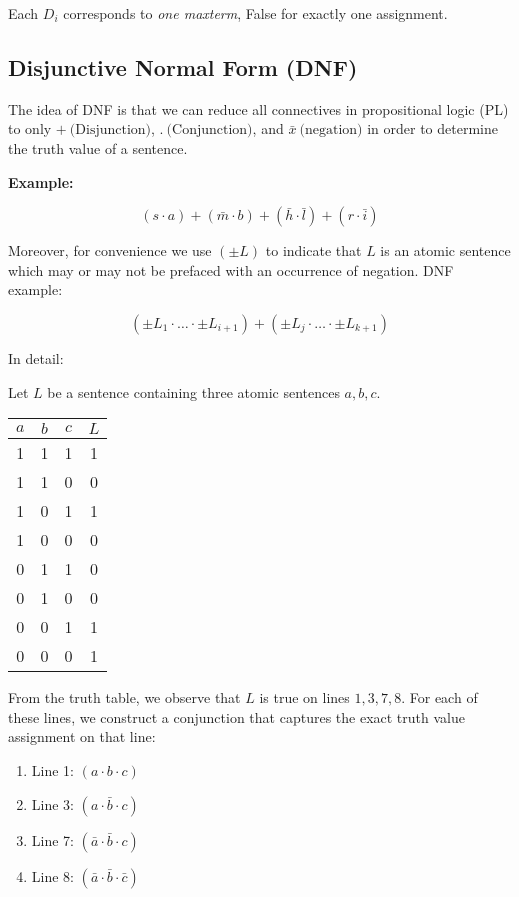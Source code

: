 \documentclass[12pt,a4paper,openany]{article}
\begin{document}
Each $D_i$ corresponds to \emph{one maxterm}, False for exactly one
assignment.

\subsection{Disjunctive Normal Form (DNF)}

The idea of DNF is that we can reduce all connectives in propositional
logic (PL) to only $+ \ \text{(Disjunction)}$,
$.\ \text{(Conjunction)}$, and $\bar x ~\text{(negation)}$ in order
to determine the truth value of a sentence.

\textbf{Example:}

$$(s \cdot a) + (\bar m \cdot b) + (\bar h \cdot \bar l) + (r \cdot \bar i)$$

Moreover, for convenience we use $(\pm L)$ to indicate that $L$ is
an atomic sentence which may or may not be prefaced with an occurrence
of negation. DNF example:

$$(\pm L_1 \cdot \dots \cdot \pm L_{i+1}) + (\pm L_j \cdot \dots \cdot \pm L_{k+1})$$

In detail:

Let $L$ be a sentence containing three atomic sentences $a, b, c$.

\begin{center}
\begin{tabular}{|c|c|c|c|}
\hline
$a$ & $b$ & $c$ & $L$ \\
\hline
1 & 1 & 1 & 1 \\
\hline
1 & 1 & 0 & 0 \\
\hline
1 & 0 & 1 & 1 \\
\hline
1 & 0 & 0 & 0 \\
\hline
0 & 1 & 1 & 0 \\
\hline
0 & 1 & 0 & 0 \\
\hline
0 & 0 & 1 & 1 \\
\hline
0 & 0 & 0 & 1 \\
\hline
\end{tabular}
\end{center}

From the truth table, we observe that $L$ is true on lines
$1, 3, 7, 8$. For each of these lines, we construct a conjunction that
captures the exact truth value assignment on that line:

\begin{enumerate}
\item Line 1: $(a \cdot b \cdot c)$
\item Line 3: $(a \cdot \bar b \cdot c)$
\item Line 7: $(\bar a \cdot \bar b \cdot c)$
\item Line 8: $(\bar a \cdot \bar b \cdot \bar c)$
\end{enumerate}
\end{document}
